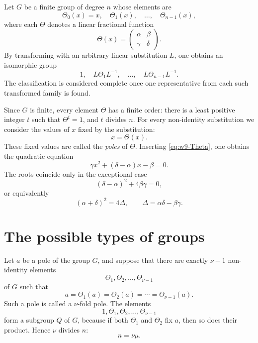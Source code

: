 \documentclass[11pt,a4paper]{book}
\begin{document}
Let $G$ be a finite group of degree $n$ whose elements are
\begin{equation}\label{eq:w9-G-elements}
 \Theta_0(x)=x,
 \quad \Theta_1(x),\quad\ldots,\quad\Theta_{n-1}(x),
\end{equation}
where each $\Theta$ denotes a linear fractional function
\begin{equation}\label{eq:w9-Theta}
 \Theta(x)=\begin{pmatrix}\alpha&\beta\\ \gamma&\delta\end{pmatrix}.
\end{equation}
By transforming with an arbitrary linear substitution $L$, one obtains an isomorphic group
\[
 1,
 \quad L\Theta_1L^{-1},
 \quad\ldots,
 \quad L\Theta_{n-1}L^{-1}.
\]
The classification is considered complete once one representative from each such transformed family is found.

Since $G$ is finite, every element $\Theta$ has a finite order: there is a least positive integer $t$ such that $\Theta^t=1$, and $t$ divides $n$.  For every non-identity substitution we consider the values of $x$ fixed by the substitution:
\begin{equation}\label{eq:w9-pole-def}
 x=\Theta(x).
\end{equation}
These fixed values are called the \emph{poles} of $\Theta$.  Inserting \eqref{eq:w9-Theta}, one obtains the quadratic equation
\begin{equation}\label{eq:w9-pole-eq}
 \gamma x^2+(\delta-\alpha)x-\beta=0.
\end{equation}
The roots coincide only in the exceptional case
\begin{equation}\label{eq:w9-discriminant}
 (\delta-\alpha)^2+4\beta\gamma=0,
\end{equation}
or equivalently
\begin{equation}\label{eq:w9-tracecondition}
 (\alpha+\delta)^2=4\Delta,
 \qquad \Delta=\alpha\delta-\beta\gamma.
\end{equation}

\section{The possible types of groups}

Let $a$ be a pole of the group $G$, and suppose that there are exactly $\nu-1$ non-identity elements
\[
 \Theta_1,\Theta_2,\ldots,\Theta_{\nu-1}
\]
of $G$ such that
\begin{equation}\label{eq:w9-nu-pole}
 a=\Theta_1(a)=\Theta_2(a)=\cdots=\Theta_{\nu-1}(a).
\end{equation}
Such a pole is called a $\nu$-fold pole.  The elements
\begin{equation}\label{eq:w9-Q}
 1,\Theta_1,\Theta_2,\ldots,\Theta_{\nu-1}
\end{equation}
form a subgroup $Q$ of $G$, because if both $\Theta_1$ and $\Theta_2$ fix $a$, then so does their product.  Hence $\nu$ divides $n$:
\begin{equation}\label{eq:w9-nmunu}
 n=\nu\mu.
\end{equation}
\end{document}
